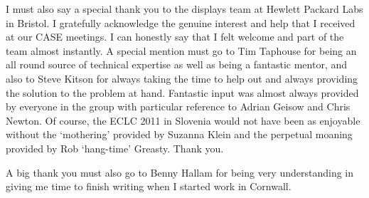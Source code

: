 I must also say a special thank you to the displays team at Hewlett Packard Labs in Bristol. I gratefully acknowledge the genuine interest and help that I received at our CASE meetings. I can honestly say that I felt welcome and part of the team almost instantly. A special mention must go to Tim Taphouse for being an all round source of technical expertise as well as being a fantastic mentor, and also to Steve Kitson for always taking the time to help out and always providing the solution to the problem at hand. Fantastic input was almost always provided by everyone in the group with particular reference to Adrian Geisow and Chris Newton. Of course, the ECLC 2011 in Slovenia would not have been as enjoyable without the `mothering' provided by Suzanna Klein and the perpetual moaning provided by Rob `hang-time' Greasty. Thank you.

 A big thank you must also go to Benny Hallam for being very understanding in giving me time to finish writing when I started work in Cornwall.

